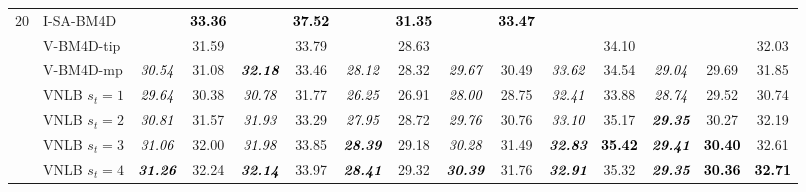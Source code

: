 \documentclass[10pt, journal, twocolumn, final, a4paper]{IEEEtran}
\newcommand{\bsic}[1]{\textcolor{black}{\textit{#1}}}
\newcommand{\Bsic}[1]{\textcolor{black}{\textbf{\textit{#1}}}}
\newcommand{\Best}[1]{\textbf{\textcolor{black}{#1}}}
\begin{document}
\begin{table}[htp!]
\begin{center}
{\begin{tabular}{ c | l |c c | c c | c c | c c | c c | c c | c }
%
			\multirow{1}{*}{$20$}
			                      & I-SA-BM4D            & \bsic{     } & \Best{33.36} & \bsic{     } & \Best{37.52}  & \bsic{     } & \Best{31.35}  & \bsic{     } & \Best{33.47} &              &               &              &              &              \\
			                      & V-BM4D-tip           & \bsic{     } &       31.59  & \bsic{     } &       33.79   & \bsic{     } &       28.63   &              &              &              &       34.10   &              &              &       32.03  \\
			                      & V-BM4D-mp            & \bsic{30.54} &       31.08  & \Bsic{32.18} &       33.46   & \bsic{28.12} &       28.32   & \bsic{29.67} &       30.49  & \bsic{33.62} &       34.54   & \bsic{29.04} &       29.69  &       31.85  \\
			                      & VNLB   $s_t = 1$     & \bsic{29.64} &       30.38  & \bsic{30.78} &       31.77   & \bsic{26.25} &       26.91   & \bsic{28.00} &       28.75  & \bsic{32.41} &       33.88   & \bsic{28.74} &       29.52  &       30.74  \\
			                      & VNLB   $s_t = 2$     & \bsic{30.81} &       31.57  & \bsic{31.93} &       33.29   & \bsic{27.95} &       28.72   & \bsic{29.76} &       30.76  & \bsic{33.10} &       35.17   & \Bsic{29.35} &       30.27  &       32.19  \\
			                      & VNLB   $s_t = 3$     & \bsic{31.06} &       32.00  & \bsic{31.98} &       33.85   & \Bsic{28.39} &       29.18   & \bsic{30.28} &       31.49  & \Bsic{32.83} & \Best{35.42}  & \Bsic{29.41} & \Best{30.40} &      {32.61} \\
			                      & VNLB   $s_t = 4$     & \Bsic{31.26} &       32.24  & \Bsic{32.14} &       33.97   & \Bsic{28.41} &       29.32   & \Bsic{30.39} &       31.76  & \Bsic{32.91} &      {35.32}  & \Bsic{29.35} & \Best{30.36} & \Best{32.71} \\\hline

\end{tabular}}
\end{center}
\end{table}
\end{document}
